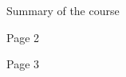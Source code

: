 \documentclass[pdf]{prosper}
\begin{document}
\small

\begin{slide}{Summary of the course}



\end{slide}

\begin{slide}{Page 2}


  
\end{slide}

\begin{slide}{Page 3}


  
\end{slide}

\end{document}
